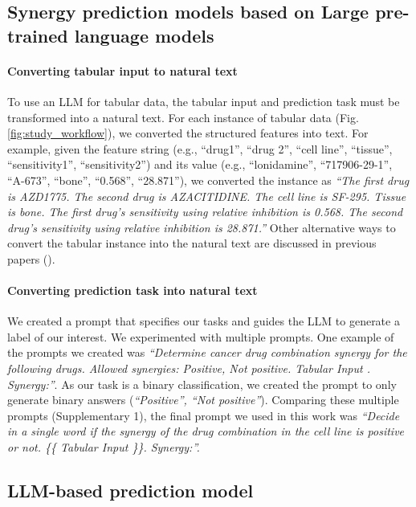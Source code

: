 {\subsection{Synergy prediction models based on Large pre-trained language models}
\label{sec:convert}

\paragraph{Converting tabular input to natural text}
To use an LLM for tabular data, the tabular input and prediction task must be transformed into a natural text. For each instance of tabular data (Fig. \ref{fig:study_workflow}), we converted the structured features into text. For example, given the feature string (e.g., ``drug1'', ``drug 2'', ``cell line'', ``tissue'', ``sensitivity1'', ``sensitivity2'') and its value (e.g., ``lonidamine'', ``717906-29-1'', ``A-673'', ``bone'', ``0.568'', ``28.871''), we converted the instance as \emph{``The first drug is AZD1775. The second drug is AZACITIDINE. The cell line is SF-295. Tissue is bone. The first drug's sensitivity using relative inhibition is 0.568. The second drug's sensitivity using relative inhibition is 28.871.''} Other alternative ways to convert the tabular instance into the natural text are discussed in previous papers (\cite{li_deep_2020, narayan_can_2022}).

\paragraph{Converting prediction task into natural text}
We created a prompt that specifies our tasks and guides the LLM to generate a label of our interest. We experimented with multiple prompts. One example of the prompts we created was \emph{``Determine cancer drug combination synergy for the following drugs. Allowed synergies: {{Positive, Not positive}}. {{ Tabular Input }}. Synergy:''}. As our task is a binary classification, we created the prompt to only generate binary answers (\emph{``Positive'', ``Not positive''}).  Comparing these multiple prompts (Supplementary 1), the final prompt we used in this work was \emph{``Decide in a single word if the synergy of the drug combination in the cell line is positive or not. \{\{ Tabular Input \}\}. Synergy:''.}

\subsection{LLM-based prediction model}
\label{sec:llm-prediction-model}
}

